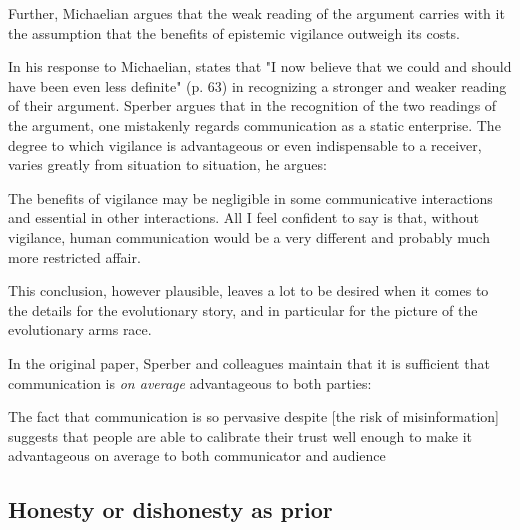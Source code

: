 Further, Michaelian argues that the weak reading of the argument carries with it the assumption that the benefits of epistemic vigilance outweigh its costs.

In his response to Michaelian, \citet{Sperber13} states that "I now believe that we could and should have been even less definite" (p. 63) in recognizing a stronger and weaker reading of their argument. Sperber argues that in the recognition of the two readings of the argument, one mistakenly regards communication as a static enterprise. The degree to which vigilance is advantageous or even indispensable to a receiver, varies greatly from situation to situation, he argues:

\begin{quoting}
    The benefits of vigilance may be negligible in some communicative interactions and essential in other interactions. All I feel confident to say is that, without vigilance, human communication would be a very different and probably much more restricted affair.
    \hfill \citep[p.~63]{Sperber13}
\end{quoting}
This conclusion, however plausible, leaves a lot to be desired when it comes to the details for the evolutionary story, and in particular for the picture of the evolutionary arms race.

In the original \citeyear{Sperber10} paper, Sperber and colleagues maintain that it is sufficient that communication is \emph{on average} advantageous to both parties:
\begin{quoting}
    The fact that communication is so pervasive despite [the risk of misinformation] suggests that people are able to calibrate their trust well enough to make it advantageous on average to both communicator and audience
    \hfill \citep[p.~360]{Sperber10}
\end{quoting}


\subsection{Honesty or dishonesty as prior}


